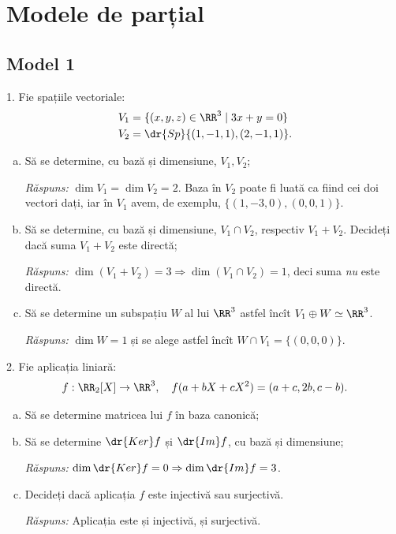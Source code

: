 \chapter{Modele de parțial}


\section{Model 1}

1. Fie spațiile vectoriale:
\begin{align*}
  V_1 &= \{ (x, y, z) \in \RR^3 \mid 3x + y = 0 \} \\
  V_2 &= \dr{Sp} \{(1, -1, 1), (2, -1, 1) \}.
\end{align*}
\begin{enumerate}[(a)]
\item Să se determine, cu bază și dimensiune, $ V_1, V_2 $;

  \emph{Răspuns:} $ \dim V_1 = \dim V_2 = 2 $. Baza în $ V_2 $
  poate fi luată ca fiind cei doi vectori dați, iar în $ V_1 $ avem,
  de exemplu, $ \{ (1, -3, 0), (0, 0, 1) \} $.
\item Să se determine, cu bază și dimensiune, $ V_1 \cap V_2 $,
  respectiv $ V_1 + V_2 $. Decideți dacă suma $ V_1 + V_2 $ este directă;

  \emph{Răspuns:} $ \dim(V_1 + V_2) = 3 \Rightarrow \dim(V_1 \cap V_2) = 1 $,
  deci suma \emph{nu} este directă.
\item Să se determine un subspațiu $ W $ al lui $ \RR^3 $ astfel încît
  $ V_1 \oplus W \simeq \RR^3 $.

  \emph{Răspuns:} $ \dim W = 1 $ și se alege astfel încît $ W \cap V_1 = \{(0, 0, 0)\} $.
\end{enumerate}

\vspace{1cm}

2. Fie aplicația liniară:
\[
  f : \RR_2[X] \to \RR^3, \quad f(a + bX + cX^2) = (a + c, 2b, c - b).
\]
\begin{enumerate}[(a)]
\item Să se determine matricea lui $ f $ în baza canonică;
\item Să se determine $ \dr{Ker} f $ și $ \dr{Im} f $, cu bază și dimensiune;

  \emph{Răspuns:} $ \dim \dr{Ker}f = 0 \Rightarrow \dim \dr{Im} f = 3 $.
\item Decideți dacă aplicația $ f $  este injectivă sau surjectivă.

  \emph{Răspuns:} Aplicația este și injectivă, și surjectivă.
\end{enumerate}

